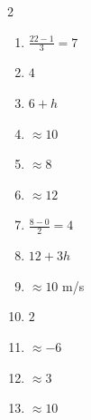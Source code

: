 \documentclass[11pt]{article}
\begin{document}
\begin{keybox}
\begin{multicols}{2}
\small
\begin{enumerate}[leftmargin=*,itemsep=3pt]
  \item $\tfrac{22-1}{3}=7$
  \item $4$
  \item $6+h$
  \item $\approx10$
  \item $\approx8$
  \item $\approx12$
  \item $\tfrac{8-0}{2}=4$
  \item $12+3h$
  \item $\approx10$ m/s
  \item $2$
  \item $\approx-6$
  \item $\approx3$
  \item $\approx10$
\end{enumerate}
\end{multicols}
\end{keybox}
\end{document}
